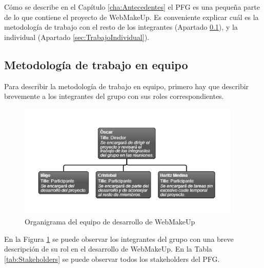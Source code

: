 Cómo se describe en el Capítulo \ref{cha:Antecedentes} el PFG es una pequeña parte de lo que contiene el proyecto de WebMakeUp. Es conveniente explicar cuál es la metodología de trabajo con el resto de los integrantes (Apartado \ref{sec:TrabajoEnEquipo}), y la individual (Apartado \ref{sec:TrabajoIndividual}).

\subsection{Metodología de trabajo en equipo}
\label{sec:TrabajoEnEquipo}

Para describir la metodología de trabajo en equipo, primero hay que describir brevemente a los integrantes del grupo con sus roles correspondientes.

\begin{figure}
\begin{center}
\includegraphics[width=0.95\textwidth]{figs/6-Equipo.png}
\end{center}
\caption{Organigrama del equipo de desarrollo de WebMakeUp}
\label{fig:OrganigramaEquipo}
\end{figure}

En la Figura \ref{fig:OrganigramaEquipo} se puede observar los integrantes del grupo con una breve descripción de su rol en el desarrollo de WebMakeUp. En la Tabla \ref{tab:Stakeholders} se puede observar todos los stakeholders del PFG.

